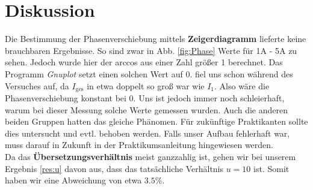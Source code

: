 \documentclass[12pt,a4paper,titlepage,headinclude,bibtotoc]{scrartcl}
\begin{document}
\section{Diskussion}
\label{sec:diskussion}
Die Bestimmung der Phasenverschiebung mittels \textbf{Zeigerdiagramm} lieferte keine brauchbaren Ergebnisse.
So sind zwar in Abb. \ref{fig:Phase} Werte für 1A - 5A zu sehen.
Jedoch wurde hier der arccos aus einer Zahl größer 1 berechnet.
Das Programm \textit{Gnuplot} setzt einen solchen Wert auf 0. 
 fiel uns schon während des Versuches auf, da $I_\text{ges}$ in etwa doppelt so groß war wie $I_1$.
Also wäre die Phasenverschiebung konstant bei 0.
Uns ist jedoch immer noch schleierhaft, warum bei dieser Messung solche Werte gemessen wurden.
Auch die anderen beiden Gruppen hatten das gleiche Phänomen.
Für zukünftige Praktikanten sollte dies untersucht und evtl. behoben werden.
Falls unser Aufbau fehlerhaft war, muss darauf in Zukunft in der Praktikumsanleitung hingewiesen werden.\\

Da das \textbf{Übersetzungsverhältnis} meist ganzzahlig ist, gehen wir bei unserem Ergebnis \eqref{res:u} davon aus, dass das tatsächliche Verhältnis $u=10$ ist.
Somit haben wir eine Abweichung von etwa $3.5\%$.
\end{document}
